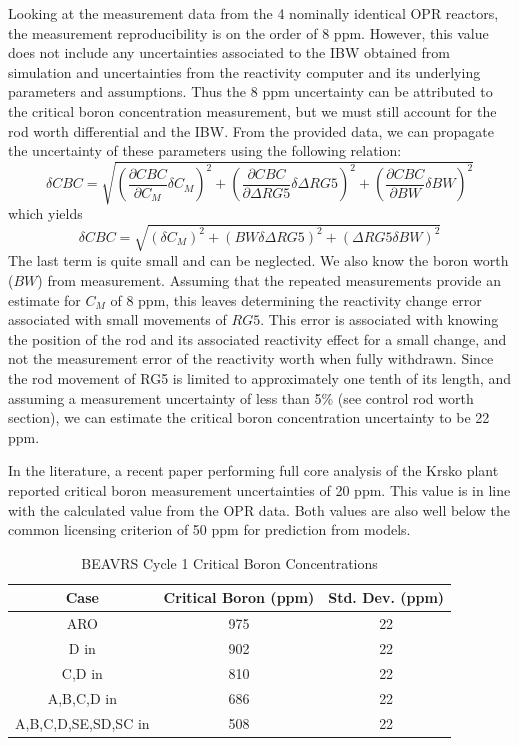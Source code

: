 \documentclass{article}
\begin{document}
Looking at the measurement data from the 4 nominally identical OPR reactors, the measurement reproducibility is on the order of 8 ppm.  However, this value does not include any uncertainties associated to the IBW obtained from simulation and uncertainties from the reactivity computer and its underlying parameters and assumptions.  Thus the 8 ppm uncertainty can be attributed to the critical boron concentration measurement, but we must still account for the rod worth differential and the IBW.  From the provided data, we can propagate the uncertainty of these parameters using the following relation:
\begin{equation}
  \delta CBC = \sqrt{\left( \frac{\partial CBC}{\partial C_M} \delta C_M \right)^2 + \left( \frac{\partial CBC}{\partial \Delta RG5} \delta \Delta RG5 \right)^2 + \left( \frac{\partial CBC}{\partial BW} \delta BW \right)^2}
\end{equation}
which yields
\begin{equation}
  \delta CBC = \sqrt{\left( \delta C_M \right)^2 + \left( BW \delta \Delta RG5 \right)^2 + \left( \Delta RG5 \delta BW \right)^2}
\end{equation}
The last term is quite small and can be neglected. We also know the boron worth ($BW$) from measurement.  Assuming that the repeated measurements provide an estimate for $C_M$ of 8 ppm, this leaves determining the reactivity change error associated with small movements of $RG5$.  This error is associated with knowing the position of the rod and its associated reactivity effect for a small change, and not the measurement error of the reactivity worth when fully withdrawn.  Since the rod movement of RG5 is limited to approximately one tenth of its length, and assuming a measurement uncertainty of less than 5\% (see control rod worth section), we can estimate the critical boron concentration uncertainty to be 22 ppm.

In the literature, a recent paper performing full core analysis of the Krsko plant reported critical boron measurement uncertainties of 20 ppm.  This value is in line with the calculated value from the OPR data.  Both values are also well below the common licensing criterion of 50 ppm for prediction from models.

\begin{table}[ht]
\centering
\caption{BEAVRS Cycle 1 Critical Boron Concentrations}
\begin{tabular}{ |c|c|c| } 
 \hline
 Case & Critical Boron (ppm) & Std. Dev. (ppm) \\  
 \hline
 ARO & 975 & 22 \\ 
 D in & 902 & 22  \\
 C,D in & 810 & 22  \\
 A,B,C,D in & 686 & 22  \\
 A,B,C,D,SE,SD,SC in & 508 & 22  \\
 \hline
 \end{tabular}
\label{tab:cyc1_boron_conc}
\end{table}
\end{document}
